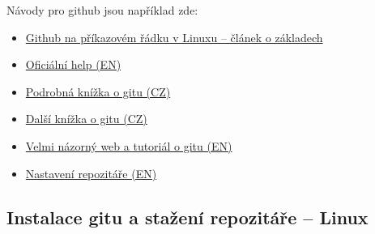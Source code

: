 Návody pro github jsou například zde: 

\begin{itemize}
	\item \href{http://www.kutac.cz/blog/pocitace-a-internety/jak-na-git-dil-1/}{Github na příkazovém řádku v Linuxu -- článek o základech}
	\item \href{https://help.github.com}{Oficiální help (EN)}
	\item \href{https://knihy.nic.cz/files/edice/pro_git.pdf}{Podrobná knížka o gitu (CZ)}
	\item \href{https://git-scm.com/book/cs/v1/\%C3\%9Avod}{Další knížka o gitu (CZ)}
	\item \href{https://learngitbranching.js.org/}{Velmi názorný web a tutoriál o gitu (EN) }
	\item \href{https://www.atlassian.com/git/tutorials/setting-up-a-repository}{Nastavení repozitáře (EN)}
	
	
\end{itemize}




\subsection{Instalace gitu a stažení repozitáře -- Linux} \label{instal_github}


